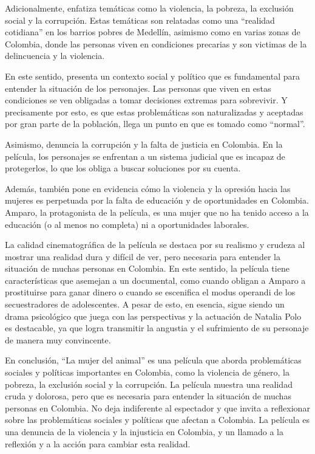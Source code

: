 \documentclass[letterpaper, 12pt]{report}
\begin{document}
Adicionalmente, enfatiza temáticas como la violencia, la
pobreza, la exclusión social y la corrupción. Estas
temáticas son relatadas como una ``realidad cotidiana'' en
los barrios pobres de Medellín, asimismo como en varias
zonas de Colombia, donde las personas viven en condiciones
precarias y son victimas de la delincuencia y la violencia.

En este sentido, presenta un contexto social y político que
es fundamental para entender la situación de los
personajes. Las personas que viven en estas condiciones se
ven obligadas a tomar decisiones extremas para sobrevivir.
Y precisamente por esto, es que estas problemáticas son
naturalizadas y aceptadas por gran parte de la población,
llega un punto en que es tomado como ``normal''.

Asimismo, denuncia la corrupción y la falta de justicia en
Colombia. En la película, los personajes se enfrentan a un
sistema judicial que es incapaz de protegerlos, lo que los
obliga a buscar soluciones por su cuenta.

Además, también pone en evidencia cómo la violencia y la
opresión hacia las mujeres es perpetuada por la falta de
educación y de oportunidades en Colombia. Amparo, la
protagonista de la película, es una mujer que no ha tenido
acceso a la educación (o al menos no completa) ni a
oportunidades laborales.

La calidad cinematográfica de la película se destaca por su
realismo y crudeza al mostrar una realidad dura y difícil
de ver, pero necesaria para entender la situación de muchas
personas en Colombia. En este sentido, la película tiene
características que asemejan a un documental, como cuando
obligan a Amparo a prostituirse para ganar dinero o cuando
se escenifica el modus operandi de los secuestradores de
adolescentes. A pesar de esto, en esencia, sigue siendo un
drama psicológico que juega con las perspectivas y la
actuación de Natalia Polo es destacable, ya que logra
transmitir la angustia y el sufrimiento de su personaje de
manera muy convincente.

En conclusión, ``La mujer del animal'' es una película que
aborda problemáticas sociales y políticas importantes en
Colombia, como la violencia de género, la pobreza, la
exclusión social y la corrupción. La película muestra una
realidad cruda y dolorosa, pero que es necesaria para
entender la situación de muchas personas en Colombia. No
deja indiferente al espectador y que invita a reflexionar
sobre las problemáticas sociales y políticas que afectan a
Colombia. La película es una denuncia de la violencia y la
injusticia en Colombia, y un llamado a la reflexión y a la
acción para cambiar esta realidad.

\newpage

\printbibliography
\end{document}
